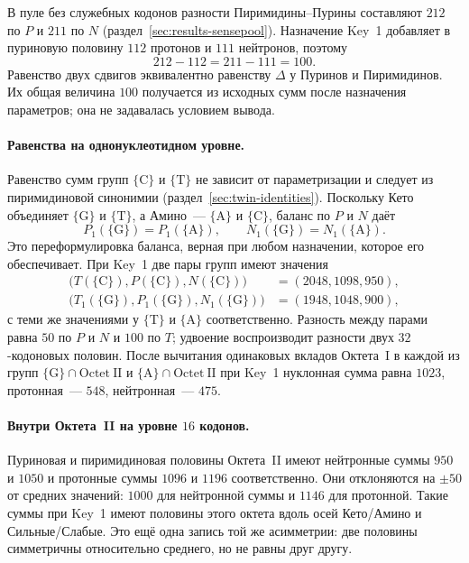 \documentclass[11pt,a4paper]{article}
\renewcommand{\_}{\origunderscore\allowbreak}
\begin{document}
В пуле без служебных кодонов разности Пиримидины--Пурины
составляют $212$ по $P$ и $211$ по $N$
(раздел~\ref{sec:results-sensepool}). Назначение Key~1
добавляет в пуриновую половину $112$ протонов и
$111$ нейтронов, поэтому
\[
212-112=211-111=100.
\]
Равенство двух сдвигов эквивалентно равенству $\Delta$
у Пуринов и Пиримидинов. Их общая величина $100$
получается из исходных сумм после назначения параметров;
она не задавалась условием вывода.

\paragraph{Равенства на однонуклеотидном уровне.}
Равенство сумм групп $\{\mathrm{C}\}$ и
$\{\mathrm{T}\}$ не зависит от параметризации и
следует из пиримидиновой синонимии
(раздел~\ref{sec:twin-identities}). Поскольку Кето
объединяет $\{\mathrm{G}\}$ и $\{\mathrm{T}\}$,
а Амино~--- $\{\mathrm{A}\}$ и $\{\mathrm{C}\}$,
баланс по $P$ и $N$ даёт
\[
P_1(\{\mathrm{G}\})=P_1(\{\mathrm{A}\}),\qquad
N_1(\{\mathrm{G}\})=N_1(\{\mathrm{A}\}).
\]
Это переформулировка баланса, верная при любом
назначении, которое его обеспечивает. При Key~1
две пары групп имеют значения
\[
\begin{aligned}
\bigl(T(\{\mathrm{C}\}),P(\{\mathrm{C}\}),N(\{\mathrm{C}\})\bigr)
&=(2048,1098,950),\\
\bigl(T_1(\{\mathrm{G}\}),P_1(\{\mathrm{G}\}),N_1(\{\mathrm{G}\})\bigr)
&=(1948,1048,900),
\end{aligned}
\]
с теми же значениями у $\{\mathrm{T}\}$ и
$\{\mathrm{A}\}$ соответственно. Разность между
парами равна $50$ по $P$ и $N$ и $100$ по $T$;
удвоение воспроизводит разности двух $32$-кодоновых
половин. После вычитания одинаковых вкладов Октета~I
в каждой из групп
$\{\mathrm{G}\}\cap\mathrm{Octet~II}$ и
$\{\mathrm{A}\}\cap\mathrm{Octet~II}$
при Key~1 нуклонная сумма равна $1023$,
протонная~--- $548$, нейтронная~--- $475$.

\paragraph{Внутри Октета~II на уровне $16$ кодонов.}
Пуриновая и пиримидиновая половины Октета~II имеют
нейтронные суммы $950$ и $1050$ и протонные суммы
$1096$ и $1196$ соответственно. Они отклоняются на $\pm50$ от средних значений:
$1000$ для нейтронной суммы и $1146$ для протонной.
Такие суммы при Key~1 имеют половины этого октета
вдоль осей Кето/Амино и Сильные/Слабые. Это ещё одна запись
той же асимметрии: две половины симметричны относительно
среднего, но не равны друг другу.
\end{document}
